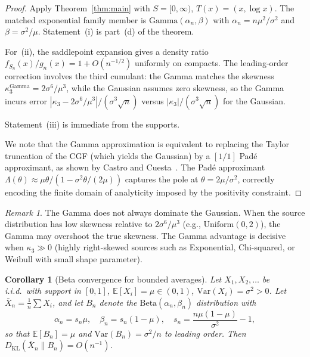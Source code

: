 \documentclass[aps,pre,twocolumn,superscriptaddress,nofootinbib]{revtex4-2}
\newtheorem{corollary}[theorem]{Corollary}
\theoremstyle{definition}
\theoremstyle{remark}
\newtheorem{remark}[theorem]{Remark}
\newcommand{\E}{\mathbb{E}}
\newcommand{\Var}{\mathrm{Var}}
\newcommand{\KL}{D_{\mathrm{KL}}}
\begin{document}
\begin{proof}
Apply Theorem~\ref{thm:main} with $S=[0,\infty)$, $T(x)=(x,\log x)$.  The
matched exponential family member is $\mathrm{Gamma}(\alpha_n,\beta)$ with
$\alpha_n=n\mu^2/\sigma^2$ and $\beta=\sigma^2/\mu$.  Statement~(i) is
part~(d) of the theorem.

For~(ii), the saddlepoint expansion gives a density ratio
$f_{S_n}(x)/g_n(x)=1+O(n^{-1/2})$ uniformly on compacts.  The leading-order
correction involves the third cumulant: the Gamma matches the skewness
$\kappa_3^{\mathrm{Gamma}}=2\sigma^6/\mu^3$, while the Gaussian assumes zero
skewness, so the Gamma incurs error $|\kappa_3-2\sigma^6/\mu^3|/(\sigma^3\sqrt{n})$
versus $|\kappa_3|/(\sigma^3\sqrt{n})$ for the Gaussian.

Statement~(iii) is immediate from the supports.

We note that the Gamma approximation is equivalent to replacing the Taylor
truncation of the CGF (which yields the Gaussian) by a $[1/1]$ Pad\'{e}
approximant, as shown by Castro and Cuesta~\cite{CastroCuesta2026}.  The
Pad\'{e} approximant $\Lambda(\theta)\approx\mu\theta/(1-\sigma^2\theta/(2\mu))$
captures the pole at $\theta=2\mu/\sigma^2$, correctly encoding the finite
domain of analyticity imposed by the positivity constraint.
\end{proof}

\begin{remark}\label{rem:gamma-caveat}
The Gamma does not always dominate the Gaussian.  When the source distribution
has low skewness relative to $2\sigma^6/\mu^3$ (e.g., $\mathrm{Uniform}(0,2)$),
the Gamma may overshoot the true skewness.  The Gamma advantage is decisive
when $\kappa_3\gg 0$ (highly right-skewed sources such as Exponential,
Chi-squared, or Weibull with small shape parameter).
\end{remark}

\begin{corollary}[Beta convergence for bounded averages]\label{cor:beta}
Let $X_1,X_2,\ldots$ be i.i.d.\ with support in $[0,1]$, $\E[X_i]=\mu\in(0,1)$,
$\Var(X_i)=\sigma^2>0$.  Let $\bar{X}_n=\frac{1}{n}\sum X_i$, and let $B_n$
denote the $\mathrm{Beta}(\alpha_n,\beta_n)$ distribution with
\begin{equation}
\alpha_n=s_n\mu,\quad\beta_n=s_n(1{-}\mu),\quad
s_n=\frac{n\mu(1{-}\mu)}{\sigma^2}-1,
\end{equation}
so that $\E[B_n]=\mu$ and $\Var(B_n)=\sigma^2/n$ to leading order.  Then
$\KL(\bar{X}_n\|B_n)=O(n^{-1})$.
\end{corollary}
\end{document}
